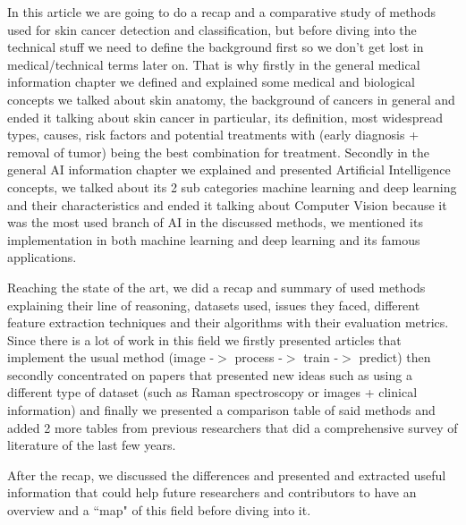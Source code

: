 In this article we are going to do a recap and a comparative study of methods used for skin cancer detection and classification, but before diving into the technical stuff we need to define the background first so we don't get lost in medical/technical terms later on. That is why firstly in the general medical information chapter we defined and explained some medical and biological concepts we talked about skin anatomy, the background of cancers in general and ended it talking about skin cancer in particular, its definition, most widespread types, causes, risk factors and potential treatments with (early diagnosis + removal of tumor) being the best combination for treatment. Secondly in the general AI information chapter we explained and presented Artificial Intelligence concepts, we talked about its 2 sub categories machine learning and deep learning and their characteristics and ended it talking about Computer Vision because it was the most used branch of AI in the discussed methods, we mentioned its implementation in both machine learning and deep learning and its famous applications.

Reaching the state of the art, we did a recap and summary of used methods explaining their line of reasoning, datasets used, issues they faced, different feature extraction techniques and their algorithms with their evaluation metrics. Since there is a lot of work in this field we firstly presented articles that implement the usual method (image -$>$ process -$>$ train -$>$ predict) then secondly concentrated on papers that presented new ideas such as using a different type of dataset (such as Raman spectroscopy or images + clinical information) and finally we presented a comparison table of said methods and added 2 more tables from previous researchers that did a comprehensive survey of literature of the last few years.

After the recap, we discussed the differences and presented and extracted useful information that could help future researchers and contributors to have an overview and a ``map" of this field before diving into it. 